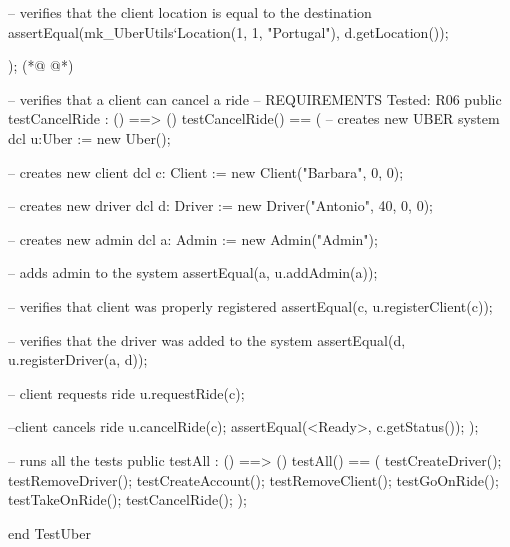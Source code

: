 \begin{vdmpp}[breaklines=true]
    -- verifies that the client location is equal to the destination
    assertEqual(mk_UberUtils`Location(1, 1, "Portugal"), d.getLocation());
    
    
   );
(*@
\label{testCancelRide:192}
@*)
   
   -- verifies that a client can cancel a ride
   -- REQUIREMENTS Tested: R06
   public testCancelRide : () ==> ()
    testCancelRide() == (
     -- creates new UBER system
      dcl u:Uber := new Uber();
     
      -- creates new client
      dcl c: Client := new Client("Barbara", 0, 0);
     
      -- creates new driver
     dcl d: Driver := new Driver("Antonio", 40, 0, 0);
     
     -- creates new admin
       dcl a: Admin := new Admin("Admin");
   
       -- adds admin to the system
       assertEqual({a}, u.addAdmin(a));
     
      -- verifies that client was properly registered
      assertEqual({c}, u.registerClient(c));
     
      -- verifies that the driver was added to the system
      assertEqual({d}, u.registerDriver(a, d));
     
      -- client requests ride
      u.requestRide(c);
      
      --client cancels ride
      u.cancelRide(c);
      assertEqual(<Ready>, c.getStatus());
    );
  
  -- runs all the tests
  public testAll : () ==> ()
   testAll() == (
    testCreateDriver();
    testRemoveDriver();
    testCreateAccount();
    testRemoveClient();
    testGoOnRide();
    testTakeOnRide();
    testCancelRide();
   ); 


end TestUber
\end{vdmpp}
